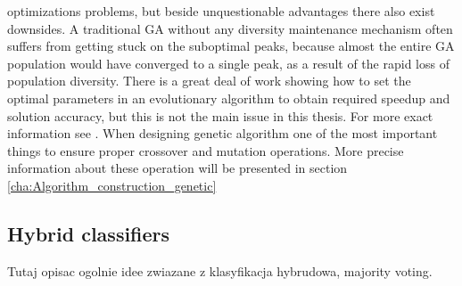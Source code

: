 optimizations problems, but beside unquestionable advantages there also exist downsides. 
A traditional GA without any diversity maintenance mechanism often suffers from getting 
stuck on the suboptimal peaks, because almost the entire GA population would have converged 
to a single peak, as a result of the rapid loss of population diversity. 
There is a great deal of work showing how to set the optimal parameters in an evolutionary 
algorithm to obtain required speedup and solution accuracy, but this is not the main issue 
in this thesis. For more exact information see .
When designing genetic algorithm one of the most important things to ensure proper crossover 
and mutation operations. More precise information about these operation will be
presented in section \ref{cha:Algorithm_construction_genetic}

\subsection{Hybrid classifiers}
\label{cha:Hybrid_classifiers}
Tutaj opisac ogolnie idee zwiazane z klasyfikacja hybrudowa, 
majority voting. 
